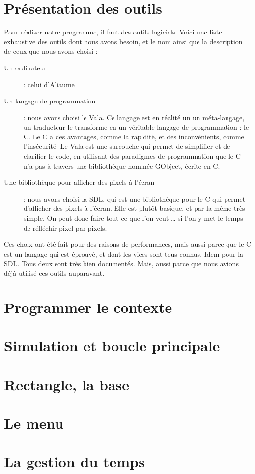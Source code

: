 \section{Présentation des outils}
  Pour réaliser notre programme, il faut des outils logiciels.
  Voici une liste exhaustive des outils dont nous avons besoin, et le 
  nom ainsi que la description de ceux que nous avons choisi : 
    \begin{description}
      \item[Un ordinateur] : celui d'Aliaume 
      \item[Un langage de programmation] : nous avons choisi le Vala. Ce langage est en réalité un
        un méta-langage, un traducteur le transforme en un véritable langage de programmation : le C.
        Le C a des avantages, comme la rapidité, et des inconvénients, comme l'insécurité. Le Vala est une 
        surcouche qui permet de simplifier et de clarifier le code, en utilisant des paradigmes de programmation
        que le C n'a pas à travers une bibliothèque nommée GObject, écrite en C.
      \item[Une bibliothèque pour afficher des pixels à l'écran] : nous avons choisi la SDL, qui est une bibliothèque pour le C qui permet d'afficher des pixels à l'écran. Elle est plutôt basique, et par la même très simple. On peut donc faire tout ce que l'on veut … si l'on y met le temps de réfléchir pixel par pixels.
    \end{description}
  
  Ces choix ont été fait pour des raisons de performances, mais aussi parce que le C est un langage qui est éprouvé, et dont les vices sont tous connus. Idem pour la SDL. Tous deux sont très bien documentés. Mais, aussi parce que nous avions déjà utilisé ces outils auparavant.

\section{Programmer le contexte}
  

\section{Simulation et boucle principale}
  
\section{Rectangle, la base}
  
  
\section{Le menu}
  
  
\section{La gestion du temps}
  
    
    
    
     
